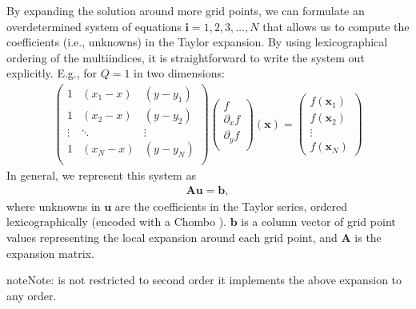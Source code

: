 \documentclass[letterpaper,10pt,english]{sphinxmanual}
\begin{document}
\sphinxAtStartPar
By expanding the solution around more grid points, we can formulate an over\sphinxhyphen{}determined system of equations \(\mathbf{i} = 1, 2, 3, \ldots, N\) that allows us to compute the coefficients (i.e., unknowns) in the Taylor expansion.
By using lexicographical ordering of the multi\sphinxhyphen{}indices, it is straightforward to write the system out explicitly.
E.g., for \(Q = 1\) in two dimensions:
\begin{equation*}
\begin{split}\begin{pmatrix}
1 & (x_1 - x) & (y - y_1) \\
1 & (x_2 - x) & (y - y_2) \\
\vdots & \ddots & \vdots \\
1 & (x_N - x) & (y - y_N) \\
\end{pmatrix}
\begin{pmatrix}
f            \\
\partial_x f \\
\partial_y f \\
\end{pmatrix}(\mathbf{x})
=
\begin{pmatrix}
f(\mathbf{x}_1) \\
f(\mathbf{x}_2) \\
\vdots \\
f(\mathbf{x}_N)
\end{pmatrix}\end{split}
\end{equation*}
\sphinxAtStartPar
In general, we represent this system as
\begin{equation*}
\begin{split}\mathbf{A}\mathbf{u} = \mathbf{b},\end{split}
\end{equation*}
\sphinxAtStartPar
where unknowns in \(\mathbf{u}\) are the coefficients in the Taylor series, ordered lexicographically (encoded with a Chombo ).
\(\mathbf{b}\) is a column vector of grid point values representing the local expansion around each grid point, and \(\mathbf{A}\) is the expansion matrix.

\begin{sphinxadmonition}{note}{Note:}
\sphinxAtStartPar
{} is not restricted to second order \textendash{} it implements the above expansion to any order.
\end{sphinxadmonition}
\end{document}
